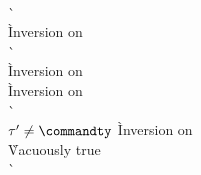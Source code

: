 \begin{description}
\begin{tabbing}
  \\
    \`  \\
    \` Inversion on  \\
    \`  \\
    \` Inversion on  \\
    \` Inversion on  \\
    \`  \\
  $\tau' \not= \commandty$
    \` Inversion on  \\
    \` Vacuously true \\
    \`  \\

  \end{tabbing}


\end{description}
